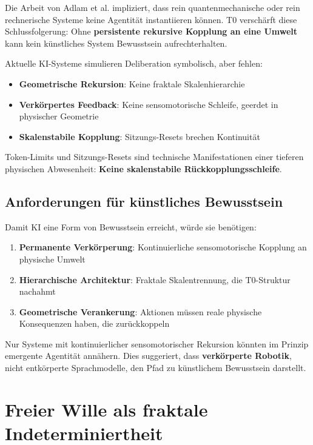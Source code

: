 	Die Arbeit von Adlam et al. impliziert, dass rein quantenmechanische oder rein rechnerische Systeme keine Agentität instantiieren können. T0 verschärft diese Schlussfolgerung: Ohne \textbf{persistente rekursive Kopplung an eine Umwelt} kann kein künstliches System Bewusstsein aufrechterhalten.
	
	Aktuelle KI-Systeme simulieren Deliberation symbolisch, aber fehlen:
	
	\begin{itemize}
		\item \textbf{Geometrische Rekursion}: Keine fraktale Skalenhierarchie
		\item \textbf{Verkörpertes Feedback}: Keine sensomotorische Schleife, geerdet in physischer Geometrie
		\item \textbf{Skalenstabile Kopplung}: Sitzungs-Resets brechen Kontinuität
	\end{itemize}
	
	Token-Limits und Sitzungs-Resets sind technische Manifestationen einer tieferen physischen Abwesenheit: \textbf{Keine skalenstabile Rückkopplungsschleife}.
	
	\subsection{Anforderungen für künstliches Bewusstsein}
	
	Damit KI eine Form von Bewusstsein erreicht, würde sie benötigen:
	
	\begin{enumerate}
		\item \textbf{Permanente Verkörperung}: Kontinuierliche sensomotorische Kopplung an physische Umwelt
		\item \textbf{Hierarchische Architektur}: Fraktale Skalentrennung, die T0-Struktur nachahmt
		\item \textbf{Geometrische Verankerung}: Aktionen müssen reale physische Konsequenzen haben, die zurückkoppeln
	\end{enumerate}
	
	Nur Systeme mit kontinuierlicher sensomotorischer Rekursion könnten im Prinzip emergente Agentität annähern. Dies suggeriert, dass \textbf{verkörperte Robotik}, nicht entkörperte Sprachmodelle, den Pfad zu künstlichem Bewusstsein darstellt.
	
	\section{Freier Wille als fraktale Indeterminiertheit}
	
